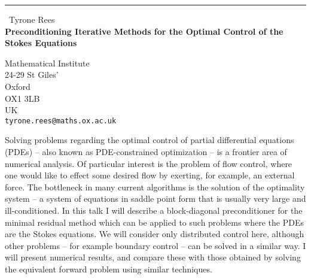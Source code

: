 \documentclass{report}
\begin{document}
\begin{center}
\rule{6in}{1pt} \
{\large Tyrone Rees \\
{\bf Preconditioning Iterative Methods for the Optimal Control of the Stokes Equations}}

Mathematical Institute \\ 24-29 St Giles' \\ Oxford \\ OX1 3LB \\ UK
\\
{\tt tyrone.rees@maths.ox.ac.uk}\end{center}

Solving problems regarding the optimal control of partial differential
equations (PDEs) -- also known as PDE-constrained optimization -- is a
frontier area of numerical analysis. Of particular interest is the
problem of flow control, where one would like to effect some desired flow
by exerting, for example, an external force. The bottleneck in many
current algorithms is the solution of the optimality system -- a system
of equations in saddle point form that is usually very large and
ill-conditioned. In this talk I will describe a block-diagonal
preconditioner for the minimal residual method which can be applied to
such problems where the PDEs are the Stokes equations. We will consider
only distributed control here, although other problems -- for example
boundary control -- can be solved in a similar way. I will present
numerical results, and compare these with those obtained by solving the
equivalent forward problem using similar techniques.
\end{document}
